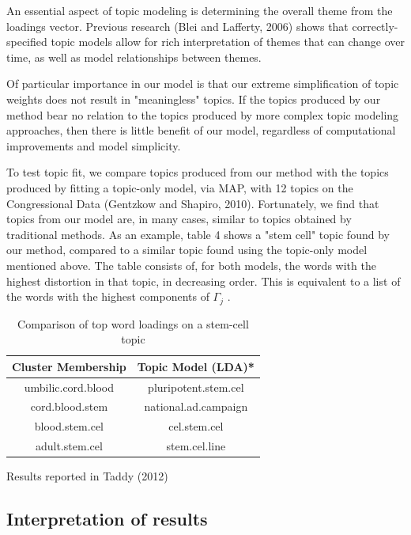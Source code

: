 \documentclass[12pt]{article}
\begin{document}
An essential aspect of topic modeling is determining the overall theme from the loadings vector. Previous research (Blei and Lafferty, 2006) shows that correctly-specified topic models allow for rich interpretation of themes that can change over time, as well as model relationships between themes. 

Of particular importance in our model is that our extreme simplification of topic weights does not result in "meaningless" topics. 
If the topics produced by our method bear no relation to the topics produced by more complex topic modeling approaches, then there is little benefit of our model, regardless of computational improvements and model simplicity. 

To test topic fit, we compare topics produced from our method with the topics produced by fitting a topic-only model, via MAP, with 12 topics on the Congressional Data (Gentzkow and Shapiro, 2010). Fortunately, we find that topics from our model are, in many cases, similar to topics obtained by traditional methods. As an example, table 4 shows a "stem cell" topic found by our method, compared to a similar topic found using the topic-only model mentioned above. The table consists of, for both models, the words with the highest distortion in that topic, in decreasing order. This is equivalent to a list of the words with the highest components of $\Gamma_j$ .  

\begin{table}[!htbp]
\begin{threeparttable}
\caption{Comparison of top word loadings on a stem-cell topic} \label{tab:title}
\centering
\begin{tabular}{  c  c }
Cluster Membership & Topic Model (LDA)* \\
\hline
umbilic.cord.blood & pluripotent.stem.cel \\
cord.blood.stem  & national.ad.campaign \\
blood.stem.cel   & cel.stem.cel \\
adult.stem.cel & stem.cel.line \\
\end{tabular}
\begin{tablenotes}
\small
\item  *Results reported in Taddy (2012)
\end{tablenotes}
\end{threeparttable}
\end{table}

\subsection{Interpretation of results}
\end{document}

